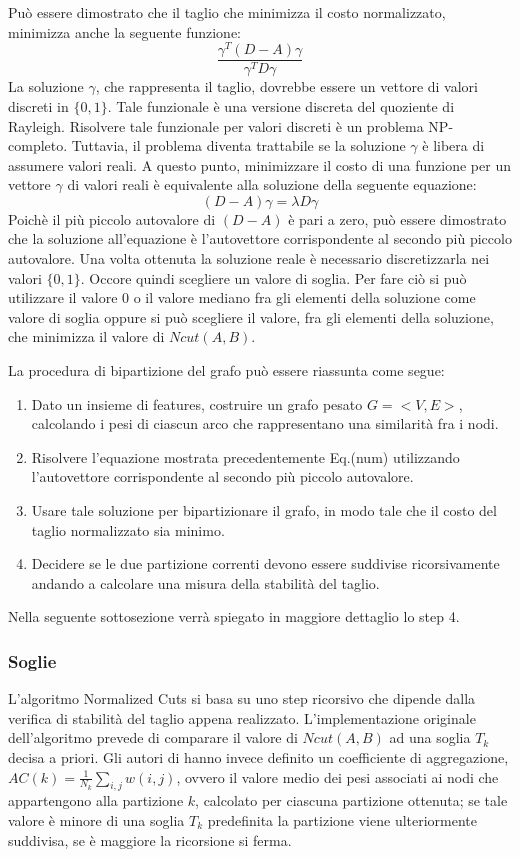 Può essere dimostrato che il taglio che minimizza il costo normalizzato, minimizza anche la seguente funzione: $$ \frac{\gamma^{T}(D-A)\gamma}{\gamma^{T}D\gamma}$$
La soluzione $\gamma$, che rappresenta il taglio, dovrebbe essere un vettore di valori discreti in $\lbrace 0,1 \rbrace$. Tale funzionale è una versione discreta del quoziente di Rayleigh. Risolvere tale funzionale per valori discreti è un problema NP-completo. Tuttavia, il problema diventa trattabile se la soluzione $\gamma$ è libera di assumere valori reali. A questo punto, minimizzare il costo di una funzione per un vettore $\gamma$ di valori reali è equivalente alla soluzione della seguente equazione: $$ (D-A) \gamma = \lambda D \gamma $$
Poichè il più piccolo autovalore di $(D-A)$ è pari a zero, può essere dimostrato che la soluzione all'equazione è l'autovettore corrispondente al secondo più piccolo autovalore.
Una volta ottenuta la soluzione reale è necessario discretizzarla nei valori $\lbrace 0,1 \rbrace$. Occore quindi scegliere un valore di soglia. Per fare ciò si può utilizzare il valore 0 o il valore mediano fra gli elementi della soluzione come valore di soglia oppure si può scegliere il valore, fra gli elementi della soluzione, che minimizza il valore di $Ncut(A,B)$.

La procedura di bipartizione del grafo può essere riassunta come segue:
\begin{enumerate}
\item Dato un insieme di features, costruire un grafo pesato $G = <V,E>$, calcolando i pesi di ciascun arco che rappresentano una similarità fra i nodi.
\item Risolvere l'equazione mostrata precedentemente Eq.(num) utilizzando l'autovettore corrispondente al secondo più piccolo autovalore.
\item Usare tale soluzione per bipartizionare il grafo, in modo tale che il costo del taglio normalizzato sia minimo.
\item Decidere se le due partizione correnti devono essere suddivise ricorsivamente andando a calcolare una misura della stabilità del taglio.
\end{enumerate}

Nella seguente sottosezione verrà spiegato in maggiore dettaglio lo step 4.

\subsubsection{Soglie}

L'algoritmo Normalized Cuts si basa su uno step ricorsivo che dipende dalla verifica di stabilità del taglio appena realizzato. L'implementazione originale dell'algoritmo prevede di comparare il valore di $Ncut(A,B)$ ad una soglia $T_{k}$ decisa a priori. Gli autori di \cite{ Amerini2014831} hanno invece definito un coefficiente di aggregazione, $AC(k) = \frac{1}{N_{k}} \sum_{i,j} w(i,j)$, ovvero il valore medio dei pesi associati ai nodi che appartengono alla partizione $k$, calcolato per ciascuna partizione ottenuta; se tale valore è minore di una soglia $T_{k}$ predefinita la partizione viene ulteriormente suddivisa, se è maggiore la ricorsione si ferma.

